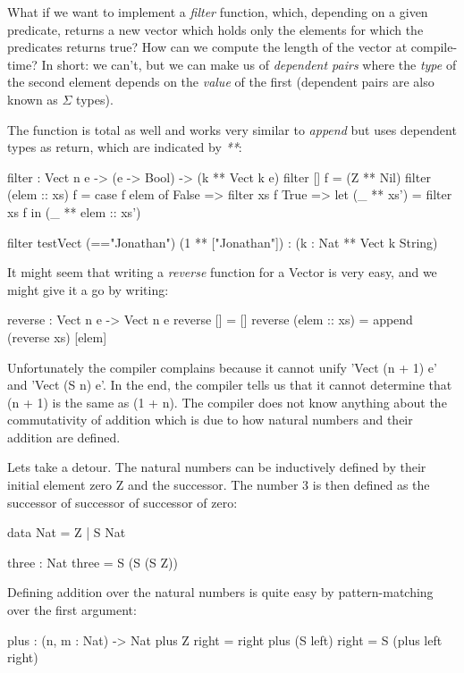 What if we want to implement a \textit{filter} function, which, depending on a given predicate, returns a new vector which holds only the elements for which the predicates returns true? How can we compute the length of the vector at compile-time? In short: we can't, but we can make us of \textit{dependent pairs} where the \textit{type} of the second element depends on the \textit{value} of the first (dependent pairs are also known as $\Sigma$ types).

The function is total as well and works very similar to \textit{append} but uses dependent types as return, which are indicated by \textit{**}:

\begin{HaskellCode}
filter : Vect n e -> (e -> Bool) -> (k ** Vect k e)
filter [] f = (Z ** Nil)
filter (elem :: xs) f =
  case f elem of
    False => filter xs f
    True  => let (_ ** xs') = filter xs f
             in  (_ ** elem :: xs')
             
filter testVect (=="Jonathan")
(1 ** ["Jonathan"]) : (k : Nat ** Vect k String)
\end{HaskellCode}

It might seem that writing a \textit{reverse} function for a Vector is very easy, and we might give it a go by writing:
\begin{HaskellCode}
reverse : Vect n e -> Vect n e
reverse [] = []
reverse (elem :: xs) = append (reverse xs) [elem]
\end{HaskellCode}

Unfortunately the compiler complains because it cannot unify 'Vect (n + 1) e' and 'Vect (S n) e'. In the end, the compiler tells us that it cannot determine that (n + 1) is the same as (1 + n). The compiler does not know anything about the commutativity of addition which is due to how natural numbers and their addition are defined.

Lets take a detour. The natural numbers can be inductively defined by their initial element zero Z and the successor. The number 3 is then defined as the successor of successor of successor of zero:

\begin{HaskellCode}
data Nat = Z | S Nat

three : Nat 
three = S (S (S Z))
\end{HaskellCode}

Defining addition over the natural numbers is quite easy by pattern-matching over the first argument: 

\begin{HaskellCode}
plus : (n, m : Nat) -> Nat
plus Z right        = right
plus (S left) right = S (plus left right)
\end{HaskellCode}

